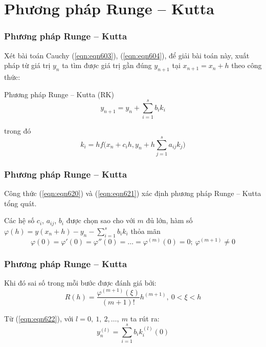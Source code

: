 \section{Phương pháp Runge – Kutta}
\begin{frame}
	\frametitle{Phương pháp Runge – Kutta}
	Xét bài toán Cauchy (\ref{eqn:eqn603}), (\ref{eqn:eqn604}), để giải bài toán này, xuất pháp từ giá trị $y_n$ ta tìm được giá trị gần đúng $y_{n+1}$ tại $x_{n+1}=x_n + h$ theo công thức:\\
	\begin{block}{Phương pháp Runge – Kutta (RK)}
	\begin{equation}\label{eqn:eqn620}
		y_{n+1}=y_n+\sum\limits_{i=1}^s b_i k_i
	\end{equation}
	\end{block}
	trong đó\\
	\begin{equation}\label{eqn:eqn621}
		k_i=hf\Bigg(x_n+c_ih, y_n+h\sum\limits_{j=1}^s a_{ij} k_j\Bigg)
	\end{equation}
\end{frame}

\begin{frame}
	\frametitle{Phương pháp Runge – Kutta}
	Công thức (\ref{eqn:eqn620}) và (\ref{eqn:eqn621}) xác định phương pháp Runge – Kutta tổng quát.\par

	Các hệ số $c_i$, $a_{ij}$, $b_i$ được chọn sao cho với $m$ đủ lớn, hàm số $\varphi(h)=y(x_n+h)-y_n-\sum\limits_{i=1}^s b_i k_i$ thỏa mãn
	\begin{equation}\label{eqn:eqn622}
		\varphi(0)=\varphi'(0)=\varphi''(0)=\ldots=\varphi^{(m)}(0)=0;~\varphi^{(m+1)}\neq 0
	\end{equation}
\end{frame}

\begin{frame}
	\frametitle{Phương pháp Runge – Kutta}
	Khi đó sai số trong mỗi bước được đánh giá bởi:\\
	\begin{equation}\label{eqn:eqn623}
		R(h)=\frac{\varphi^{(m+1)} \left(\xi\right)}{(m+1)!}h^{(m+1)},~0<\xi<h
	\end{equation}

	Từ (\ref{eqn:eqn622}), với $l=0,~1,~2,\ldots,~m$ ta rút ra:
	\begin{equation}\label{eqn:eqn624}
		y^{(l)}_n=\sum\limits_{i=1}^s b_i k^{(l)}_i (0)
	\end{equation}
\end{frame}

